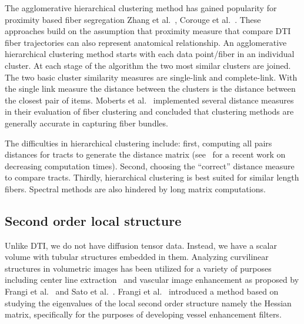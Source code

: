 The agglomerative hierarchical clustering method \cite{DudaHartStork01} has gained popularity for proximity based fiber segregation Zhang et al.~\cite{Zhang2008}, Corouge et al.~\cite{Corouge2004}. 
These approaches build on the assumption that proximity measure that compare DTI fiber trajectories can also represent anatomical relationship. An agglomerative hierarchical clustering method starts with each data point/fiber in an individual cluster. At each stage of the algorithm the two most similar clusters are joined. The two basic cluster similarity measures are single-link and complete-link. With the single link measure the distance between the clusters is the distance between the closest pair of items. 
Moberts et al.~\cite{Moberts2005} implemented several distance measures in their evaluation of fiber clustering and concluded that clustering methods are generally accurate in capturing fiber bundles. 

The difficulties in hierarchical clustering include: first, computing all pairs distances for tracts to generate the distance matrix (see~\cite{Garyfallidis2012} for a recent work on decreasing computation times). Second, choosing the ``correct'' distance measure to compare tracts. Thirdly, hierarchical clustering is best suited for similar length fibers.
Spectral methods are also hindered by long matrix computations.


\subsection{Second order local structure}
Unlike DTI, we do not have diffusion tensor data. Instead, we have a scalar volume with tubular structures embedded in them. Analyzing curvilinear structures in volumetric images has been utilized for a variety of purposes including center line extraction~\cite{Bouix2005} and vascular image enhancement as proposed by Frangi et al.~\cite{Frangi1998} and Sato et al.~\cite{Sato1997}. Frangi et al.~\cite{Frangi1998} introduced a method based on studying the eigenvalues of the local second order structure namely the Hessian matrix, specifically for the purposes of developing vessel enhancement filters.


